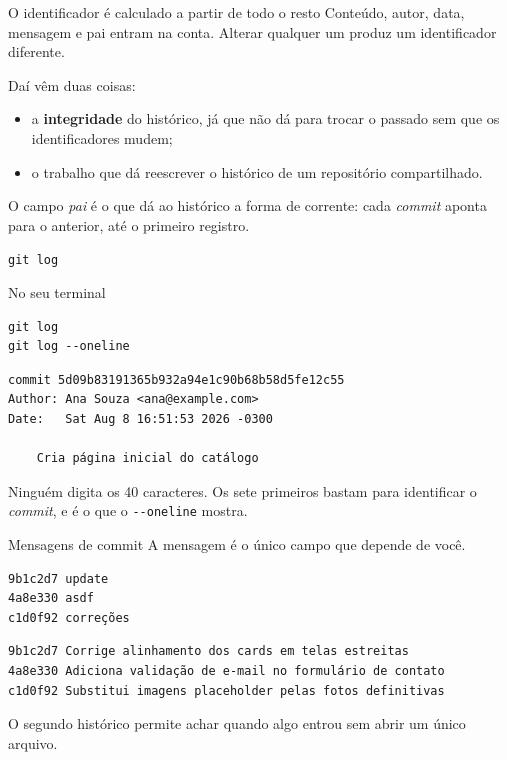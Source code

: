 \documentclass{beamer}
\newcommand{\ddash}{-\mbox{}-}
\newenvironment{noterminal}
  {\begin{exampleblock}{No seu terminal}}
  {\end{exampleblock}}
\begin{document}
\begin{frame}{O identificador é calculado a partir de todo o resto}
  Conteúdo, autor, data, mensagem e pai entram na conta. Alterar qualquer um
  produz um identificador diferente.

  \vspace{0.4cm}
  Daí vêm duas coisas:

  \begin{itemize}
    \item a \textbf{integridade} do histórico, já que não dá para trocar o
          passado sem que os identificadores mudem;
    \item o trabalho que dá reescrever o histórico de um repositório
          compartilhado.
  \end{itemize}

  \vspace{0.4cm}
  O campo \textit{pai} é o que dá ao histórico a forma de corrente: cada
  \textit{commit} aponta para o anterior, até o primeiro registro.
\end{frame}

\begin{frame}[fragile]{\texttt{git log}}
  \begin{noterminal}
    \begin{verbatim}
git log
git log --oneline
    \end{verbatim}
  \end{noterminal}

  \begin{verbatim}
commit 5d09b83191365b932a94e1c90b68b58d5fe12c55
Author: Ana Souza <ana@example.com>
Date:   Sat Aug 8 16:51:53 2026 -0300

    Cria página inicial do catálogo
  \end{verbatim}

  Ninguém digita os 40 caracteres. Os sete primeiros bastam para identificar o
  \textit{commit}, e é o que o \texttt{\ddash oneline} mostra.
\end{frame}

\begin{frame}[fragile]{Mensagens de commit}
  A mensagem é o único campo que depende de você.

  \begin{verbatim}
9b1c2d7 update
4a8e330 asdf
c1d0f92 correções
  \end{verbatim}

  \begin{verbatim}
9b1c2d7 Corrige alinhamento dos cards em telas estreitas
4a8e330 Adiciona validação de e-mail no formulário de contato
c1d0f92 Substitui imagens placeholder pelas fotos definitivas
  \end{verbatim}

  O segundo histórico permite achar quando algo entrou sem abrir um único
  arquivo.
\end{frame}
\end{document}
